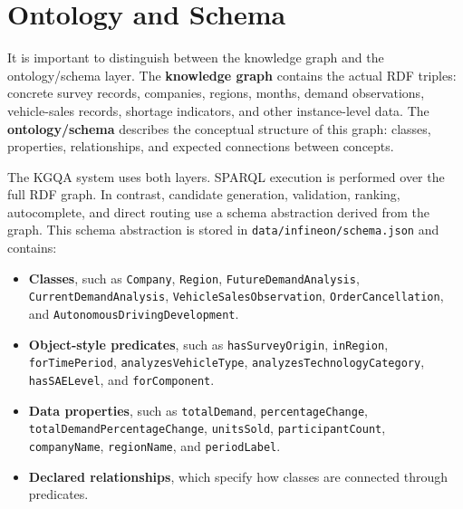 \section{Ontology and Schema}
\label{sec:ontology-and-schema}

It is important to distinguish between the knowledge graph and the ontology/schema layer. The \textbf{knowledge graph} contains the actual RDF triples: concrete survey records, companies, regions, months, demand observations, vehicle-sales records, shortage indicators, and other instance-level data. The \textbf{ontology/schema} describes the conceptual structure of this graph: classes, properties, relationships, and expected connections between concepts.

The KGQA system uses both layers. SPARQL execution is performed over the full RDF graph. In contrast, candidate generation, validation, ranking, autocomplete, and direct routing use a schema abstraction derived from the graph. This schema abstraction is stored in \texttt{data/infineon/schema.json} and contains:

\begin{itemize}
    \item \textbf{Classes}, such as \texttt{Company}, \texttt{Region}, \texttt{FutureDemandAnalysis}, \texttt{CurrentDemandAnalysis}, \texttt{VehicleSalesObservation}, \texttt{OrderCancellation}, and \texttt{AutonomousDrivingDevelopment}.
    \item \textbf{Object-style predicates}, such as \texttt{hasSurveyOrigin}, \texttt{inRegion}, \texttt{forTimePeriod}, \texttt{analyzesVehicleType}, \texttt{analyzesTechnologyCategory}, \texttt{hasSAELevel}, and \texttt{forComponent}.
    \item \textbf{Data properties}, such as \texttt{totalDemand}, \texttt{percentageChange}, \texttt{totalDemandPercentageChange}, \texttt{unitsSold}, \texttt{participantCount}, \texttt{companyName}, \texttt{regionName}, and \texttt{periodLabel}.
    \item \textbf{Declared relationships}, which specify how classes are connected through predicates.
\end{itemize}

